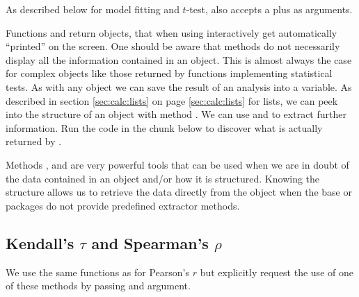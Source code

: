 \documentclass[krantz2]{krantz}\usepackage{knitr}%
\begin{document}
As described below for model fitting and $t$-test,  also accepts a  plus  as arguments.

\begin{playground}
Functions  and  return \Rlang objects, that when using \Rlang interactively get automatically ``printed'' on the screen. One should be aware that  methods do not necessarily display all the information contained in an \Rlang object. This is almost always the case for complex objects like those returned by \Rlang functions implementing statistical tests. As with any \Rlang object we can save the result of an analysis into a variable. As described in section \ref{sec:calc:lists} on page \ref{sec:calc:lists} for lists, we can peek into the structure of an object with method . We can use  and  to extract further information. Run the code in the chunk below to discover what is actually returned by .

\begin{knitrout}\footnotesize
{}\color{fgcolor}\begin{kframe}
\begin{alltt}
 \hlkwb{<-} 
\end{alltt}
\end{kframe}
\end{knitrout}

Methods ,  and  are very powerful tools that can be used when we are in doubt of the data contained in an object and/or how it is structured. Knowing the structure allows us to retrieve the data directly from the object when the base \Rlang or packages do not provide predefined extractor methods.
\end{playground}

\subsection{Kendall's $\tau$ and Spearman's $\rho$}

We use the same functions as for Pearson's $r$ but explicitly request the use of one of these methods by passing and argument.
\end{document}
